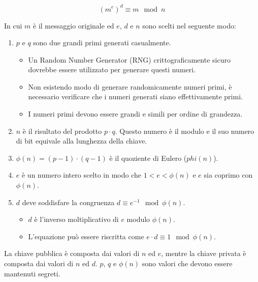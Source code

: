 \documentclass{article}
\begin{document}
$$(m^e)^d \equiv m \mod n$$

In cui $m$ è il messaggio originale ed $e$, $d$ e $n$ sono scelti nel seguente modo:
\begin{enumerate}
	\item $p$ e $q$ sono due grandi primi generati casualmente.
	      \begin{itemize}
		      \item Un Random Number Generator (RNG) crittograficamente sicuro dovrebbe essere utilizzato per generare questi numeri.
		      \item Non esistendo modo di generare randomicamente numeri primi, è necessario verificare che i numeri generati siano effettivamente primi.
		      \item I numeri primi devono essere grandi e simili per ordine di grandezza.
	      \end{itemize}
	\item $n$ è il risultato del prodotto $p \cdot q$. Questo numero è il modulo e il suo numero di bit equivale alla lunghezza della chiave.
	\item $\phi(n) = (p - 1) \cdot (q - 1)$ è il quoziente di Eulero ($phi(n)$).
	\item $e$ è un numero intero scelto in modo che $1 < e < \phi(n)$ e $e$ sia coprimo con $\phi(n)$.
	\item $d$ deve soddisfare la congruenza $d \equiv e^{-1} \mod \phi(n)$.
	      \begin{itemize}
		      \item $d$ è l'inverso moltiplicativo di $e$ modulo $\phi(n)$.
		      \item L'equazione può essere riscritta come $e \cdot d \equiv 1 \mod \phi(n)$.
	      \end{itemize}
\end{enumerate}

La chiave pubblica è composta dai valori di $n$ ed $e$, mentre la chiave privata è composta dai valori di $n$ ed $d$.
$p$, $q$ e $\phi(n)$ sono valori che devono essere mantenuti segreti.
\end{document}
